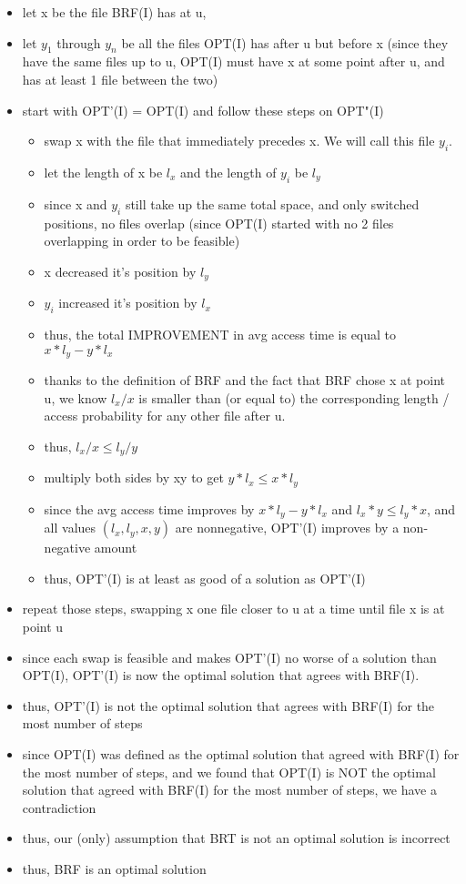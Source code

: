 \documentclass[a4paper]{article}
\begin{document}
\begin{itemize}
    \item let x be the file BRF(I) has at u, 
    \item let $y_1$ through $y_n$ be all the files OPT(I) has after u but before x (since they have the same files up to u, OPT(I) must have x at some point after u, and has at least 1 file between the two)
    \item start with OPT'(I) = OPT(I) and follow these steps on OPT"(I)
    \begin{itemize}
        \item swap x with the file that immediately precedes x. We will call this file $y_i$.
        \item let the length of x be $l_x$ and the length of $y_i$ be $l_y$
        \item since x and $y_i$ still take up the same total space, and only switched positions, no files overlap (since OPT(I) started with no 2 files overlapping in order to be feasible)
        \item x decreased it's position by $l_y$
        \item $y_i$ increased it's position by $l_x$
        \item thus, the total IMPROVEMENT in avg access time is equal to $x * l_y - y* l_x$
        \item thanks to the definition of BRF and the fact that BRF chose x at point u, we know $l_x / x$ is smaller than (or equal to) the corresponding length / access probability for any other file after u.
        \item thus, $l_x / x \leq l_y / y$
        \item multiply both sides by xy to get $y * l_x \leq x * l_y$
        \item since the avg access time improves by $x * l_y - y* l_x$ and $l_x * y \leq l_y * x$, and all values $(l_x, l_y, x, y)$ are nonnegative, OPT'(I) improves by a non-negative amount
        \item thus, OPT'(I) is at least as good of a solution as OPT'(I)
    \end{itemize}
    \item repeat those steps, swapping x one file closer to u at a time until file x is at point u
    \item since each swap is feasible and makes OPT'(I) no worse of a solution than OPT(I), OPT'(I) is now the optimal solution that agrees with BRF(I).
    \item thus, OPT'(I) is not the optimal solution that agrees with BRF(I) for the most number of steps
    \item since OPT(I) was defined as the optimal solution that agreed with BRF(I) for the most number of steps, and we found that OPT(I) is NOT the optimal solution that agreed with BRF(I) for the most number of steps, we have a contradiction
    \item thus, our (only) assumption that BRT is not an optimal solution is incorrect
    \item thus, BRF is an optimal solution
\end{itemize}
\end{document}
